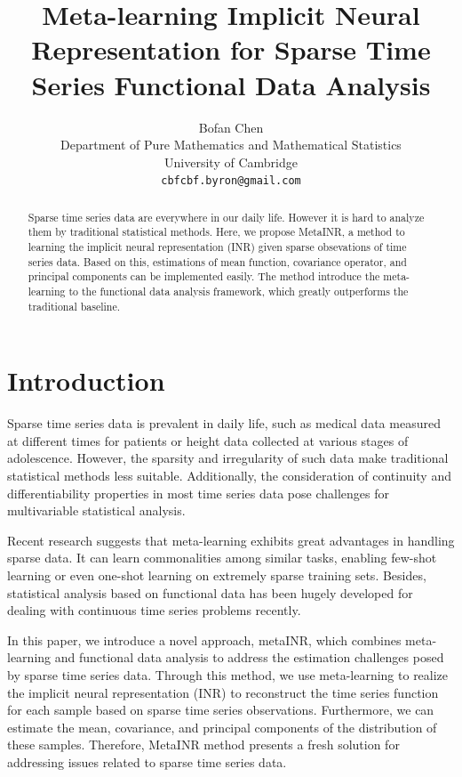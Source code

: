 \documentclass{article}
\title{Meta-learning Implicit Neural Representation for Sparse Time Series Functional Data Analysis}
\author{%
  Bofan Chen\\
  Department of Pure Mathematics and Mathematical Statistics\\
  University of Cambridge\\
  \texttt{cbfcbf.byron@gmail.com} \\}
\begin{document}
\maketitle

\begin{abstract}
  Sparse time series data are everywhere in our daily life. However it is hard to analyze them by traditional statistical methods. Here, we propose MetaINR, a method to learning the implicit neural representation (INR) given sparse obsevations of time series data.
  Based on this, estimations of mean function, covariance operator, and principal components can be implemented easily.
  The method introduce the meta-learning to the functional data analysis framework, which greatly outperforms the traditional baseline.
\end{abstract}

\section{Introduction}
Sparse time series data is prevalent in daily life, such as medical data measured at different times for patients or height data collected at various stages of adolescence. 
However, the sparsity and irregularity of such data make traditional statistical methods less suitable. 
Additionally, the consideration of continuity and differentiability properties in most time series data pose challenges for multivariable statistical analysis.

Recent research suggests that meta-learning exhibits great advantages in handling sparse data. 
It can learn commonalities among similar tasks, enabling few-shot learning or even one-shot learning on extremely sparse training sets. 
Besides, statistical analysis based on functional data has been hugely developed for dealing with continuous time series problems recently.

In this paper, we introduce a novel approach, metaINR, which combines meta-learning and functional data analysis to address the estimation challenges posed by sparse time series data. 
Through this method, we use meta-learning to realize the implicit neural representation (INR) to
reconstruct the time series function for each sample based on sparse time series observations.
Furthermore, we can estimate the mean, covariance, and principal components of the distribution of these samples.
Therefore, MetaINR method presents a fresh solution for addressing issues related to sparse time series data.
\end{document}
